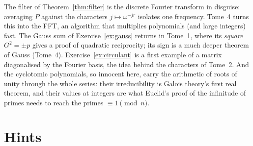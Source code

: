 \begin{beauty}
The filter of Theorem~\ref{thm:filter} is the discrete Fourier transform in disguise: averaging $P$ against the
characters $j\mapsto\omega^{-jr}$ isolates one frequency. Tome~4 turns this into the FFT, an algorithm that multiplies
polynomials (and large integers) fast. The Gauss sum of Exercise~\ref{ex:gauss} returns in Tome~1, where its
\emph{square} $G^2=\pm p$ gives a proof of quadratic reciprocity; its sign is a much deeper theorem of Gauss (Tome~4). Exercise~\ref{ex:circulant} is a first example of a matrix
diagonalised by the Fourier basis, the idea behind the characters of Tome~2. And the cyclotomic polynomials, so innocent here, carry the arithmetic of
roots of unity through the whole series: their irreducibility is Galois theory's first real theorem, and their values at integers are what Euclid's proof
of the infinitude of primes needs to reach the primes $\equiv1\pmod n$.
\end{beauty}

\section{Hints}

